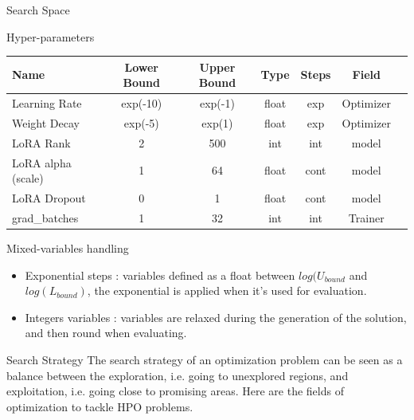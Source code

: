 \begin{frame}{Search Space}
    \begin{block}{Hyper-parameters}
    
        \begin{table}[h!]
        \centering
        \begin{tabular}{lcccccc}
        \toprule
        \textbf{Name} & \textbf{Lower Bound} & \textbf{Upper Bound} & \textbf{Type} & \textbf{Steps} & \textbf{Field} \\
        \midrule
        Learning Rate  & exp(-10) & exp(-1)  & float & exp  & Optimizer \\
        Weight Decay   & exp(-5)  & exp(1)   & float & exp & Optimizer \\
        LoRA Rank      & 2        & 500      & int   & int    & model \\
        LoRA alpha (scale) & 1    & 64       & float   & cont    & model \\
        LoRA Dropout   & 0        & 1        & float & cont    & model \\        
        grad\_batches  & 1        & 32       & int   & int    & Trainer \\
        \bottomrule
        \end{tabular}
        \end{table}
        
    \end{block}

    \begin{block}{Mixed-variables handling}
        \begin{itemize}
            \item Exponential steps : variables defined as a float between $log(U_{bound}$ and $log(L_{bound})$, the exponential is applied when it's used for evaluation.
            \item Integers variables : variables are relaxed during the generation of the solution, and then round when evaluating. 
        \end{itemize}
    \end{block}
    
\end{frame}


\begin{frame}[allowframebreaks]{Search Strategy}
    The search strategy of an optimization problem can be seen as a balance between the exploration, i.e. going to unexplored regions, and exploitation, i.e. going close to promising areas. Here are the fields of optimization to tackle HPO problems.

\end{frame}

